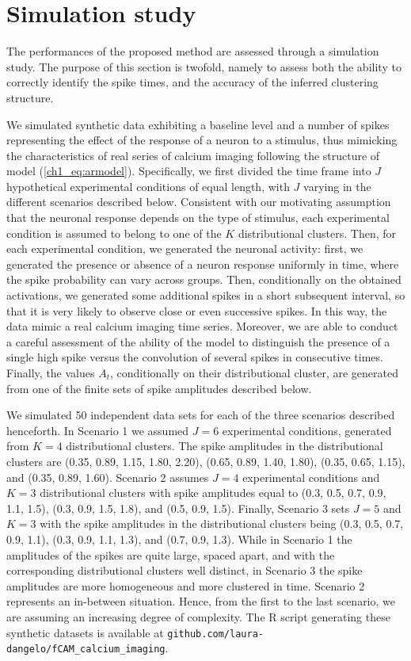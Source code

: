\section{Simulation study}
\label{s:simulations}   

The performances of the proposed method are assessed through a simulation study. The purpose of this section is twofold, namely to assess both the ability to correctly identify the spike times, and the accuracy of the inferred clustering structure.  

We simulated synthetic data exhibiting a baseline level and a number of spikes representing the effect of the response of a neuron to a stimulus, thus mimicking the characteristics of real series of calcium imaging following the structure of model (\ref{ch1_eq:armodel}).
%
Specifically, we first divided the time frame into $J$ hypothetical experimental conditions of equal length, with $J$ varying in the different scenarios described below. Consistent with our motivating assumption that the neuronal response depends on the type of stimulus, each experimental condition is assumed to belong to one of the $K$ distributional clusters. Then, for each experimental condition, we generated the neuronal activity: first, we generated the presence or absence of a neuron response uniformly in time, where the spike probability can vary across groups. 
Then, conditionally on the obtained activations, we generated some additional spikes in a short subsequent interval, so that it is very likely to observe close or even successive spikes.
%
In this way, the data mimic a real calcium imaging time series. Moreover, we are able to conduct a careful assessment of the ability of the model to distinguish the presence of a single high spike versus the convolution of several spikes in consecutive times.
Finally, the values $A_t$, conditionally on their distributional cluster, are generated from one of the finite sets of spike amplitudes described below. 

We simulated 50 independent data sets for each of the three scenarios described henceforth. In Scenario 1 we assumed $J=6$ experimental conditions, generated from $K=4$ distributional clusters. 
%
The spike amplitudes in the distributional clusters are (0.35, 0.89, 1.15, 1.80, 2.20), (0.65, 0.89, 1.40, 1.80), (0.35, 0.65, 1.15), and (0.35, 0.89, 1.60).
%
Scenario 2 assumes $J=4$ experimental conditions and $K=3$ distributional clusters with spike amplitudes equal to (0.3, 0.5, 0.7, 0.9, 1.1, 1.5), (0.3, 0.9, 1.5, 1.8), and (0.5, 0.9, 1.5). 
%
Finally, Scenario 3 sets $J=5$ and $K=3$ with the spike amplitudes in the distributional clusters being (0.3, 0.5, 0.7, 0.9, 1.1), (0.3, 0.9, 1.1, 1.3), and (0.7, 0.9, 1.3). 
%
While in Scenario 1 the amplitudes of the spikes are quite large, spaced apart, and with the corresponding distributional clusters well distinct, in Scenario 3 the spike amplitudes are more homogeneous and more clustered in time. Scenario 2 represents an in-between situation. Hence, from the first to the last scenario, we are assuming an increasing degree of complexity. The R script generating these synthetic datasets is available at \texttt{github.com/laura-dangelo/fCAM\_calcium\_imaging}.

